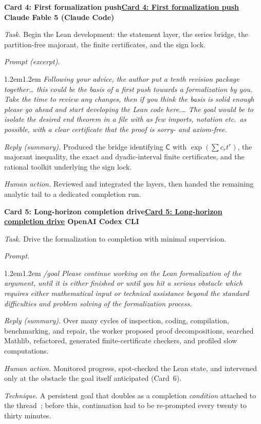 \documentclass[11pt]{article}
\theoremstyle{definition}
\theoremstyle{remark}
\newcommand{\C}{\mathsf C}
\newenvironment{haicard}[3][]{%
  \par\medskip\noindent
  \begin{lrbox}{\haibox}%
  \begin{minipage}{\dimexpr\linewidth-2\fboxsep-2\fboxrule\relax}%
    \small
    {\sffamily\bfseries
      \def\haiurl{#1}%
      \ifx\haiurl\empty #2\else\href{#1}{\textcolor{cardlink}{#2}}\fi
      \hfill #3}\par\vspace{0.45em}%
}{%
  \end{minipage}%
  \end{lrbox}%
  \fbox{\usebox{\haibox}}%
  \par\medskip
}
\newcommand{\haifield}[1]{\textit{#1.}\enspace\ignorespaces}
\newcommand{\haiprompt}[1]{\par\vspace{0.2em}\leftskip1.2em\rightskip1.2em\relax
  \small\itshape #1\par\leftskip0pt\rightskip0pt\vspace{0.2em}}
\begin{document}
\begin{haicard}{Card 4: First formalization push}{Claude Fable 5 (Claude Code)}
\haifield{Task} Begin the Lean development: the statement layer, the series
bridge, the partition-free majorant, the finite certificates, and the
sign lock.\par
\haifield{Prompt (excerpt)} \haiprompt{Following your advice, the author put a
tenth revision package together\dots{} this could be the basis of a first push
towards a formalization by you. Take the time to review any changes, then if you
think the basis is solid enough please go ahead and start developing the Lean
code here.\dots{} The goal would be to isolate the desired end theorem in a file
with as few imports, notation etc.\ as possible, with a clear certificate that
the proof is \textup{sorry}- and axiom-free.}
\haifield{Reply (summary)} Produced the bridge identifying $\C$ with
$\exp(\sum c_r t^r)$, the majorant inequality, the exact and dyadic-interval
finite certificates, and the rational toolkit underlying the sign lock.\par
\haifield{Human action} Reviewed and integrated the layers, then handed the
remaining analytic tail to a dedicated completion run.\par
\end{haicard}

\begin{haicard}{Card 5: Long-horizon completion drive}{OpenAI Codex CLI}
\haifield{Task} Drive the formalization to completion with minimal supervision.\par
\haifield{Prompt} \haiprompt{/goal Please continue working on the Lean
formalization of the argument, until it is either finished or until you hit a
serious obstacle which requires either mathematical input or technical
assistance beyond the standard difficulties and problem solving of the
formalization process.}
\haifield{Reply (summary)} Over many cycles of inspection, coding, compilation,
benchmarking, and repair, the worker proposed proof decompositions, searched
Mathlib, refactored, generated finite-certificate checkers, and profiled slow
computations.\par
\haifield{Human action} Monitored progress, spot-checked the Lean state, and
intervened only at the obstacle the goal itself anticipated (Card~6).\par
\haifield{Technique} A persistent goal that doubles as a completion
\emph{condition} attached to the thread~\cite{OpenAIGoals}; before this,
continuation had to be re-prompted every twenty to thirty minutes.\par
\end{haicard}
\end{document}

